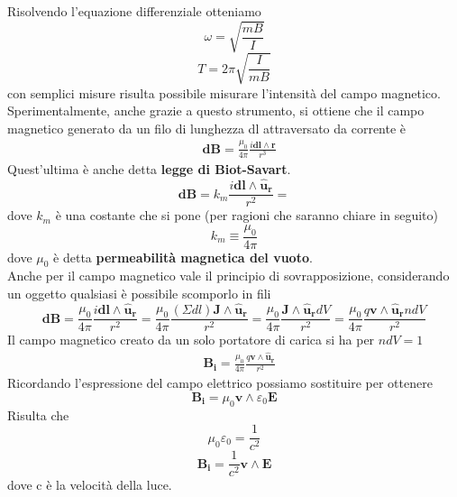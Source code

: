 \documentclass[
10pt, %
a4paper, %
oneside, %
headinclude,footinclude, %
BCOR5mm, %
]{scrartcl}
\begin{document}
Risolvendo l'equazione differenziale otteniamo
\[\omega=\sqrt{\frac{mB}{I}}\]
\[T=2\pi\sqrt{\frac{I}{mB}}\]
con semplici misure risulta possibile misurare l'intensità del campo magnetico.\\
Sperimentalmente, anche grazie a questo strumento, si ottiene che il campo magnetico generato da un filo di lunghezza dl attraversato da corrente è
\begin{align}\label{eq:campo_magnetico_filo_infinitesimo}
&\mathbf{dB}=\frac{\mu_0}{4\pi}\frac{i\mathbf{dl}\wedge\mathbf{r}}{r^3}
\end{align}
Quest'ultima è anche detta \textbf{legge di Biot-Savart}.\\
\[\mathbf{dB}=k_m\frac{i\mathbf{dl}\wedge\mathbf{\hat{u}_r}}{r^2}=\]
dove \(k_m\) è una costante che si pone (per ragioni che saranno chiare in seguito)
\[k_m \equiv\frac{\mu_0}{4\pi}\]
dove $\mu_0$ è detta \textbf{permeabilità magnetica del vuoto}.\\
Anche per il campo magnetico vale il principio di sovrapposizione, considerando un oggetto qualsiasi è possibile scomporlo in fili
\[\mathbf{dB}=\frac{\mu_0}{4\pi}\frac{i\mathbf{dl}\wedge\mathbf{\hat{u}_r}}{r^2}=\frac{\mu_0}{4\pi}\frac{(\Sigma dl)\mathbf{J}\wedge\mathbf{\hat{u}_r}}{r^2}=\frac{\mu_0}{4\pi}\frac{\mathbf{J}\wedge\mathbf{\hat{u}_r}dV}{r^2}=\frac{\mu_0}{4\pi}\frac{q\mathbf{v}\wedge\mathbf{\hat{u}_r}n dV}{r^2}\]
Il campo magnetico creato da un solo portatore di carica si ha per \(ndV=1\)
\begin{align*}
&\mathbf{B_i}=\frac{\mu_0}{4\pi}\frac{q\mathbf{v}\wedge\mathbf{\hat{u}_r}}{r^2} 
\end{align*}
Ricordando l'espressione del campo elettrico possiamo sostituire per ottenere
\[\mathbf{B_i}=\mu_0\mathbf{v}\wedge\varepsilon_0\mathbf{E}\]
Risulta che 
\[\mu_0\varepsilon_0=\frac{1}{c^2}\]
\[\mathbf{B_i}=\frac{1}{c^2}\mathbf{v}\wedge\mathbf{E}\]
dove c è la velocità della luce.
\end{document}
